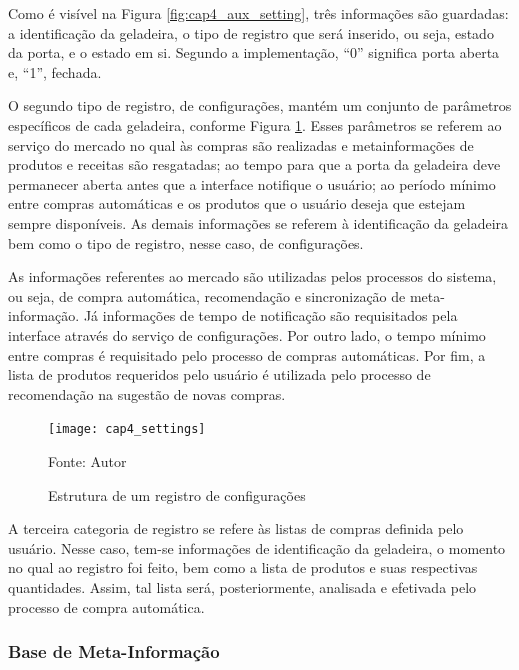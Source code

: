 Como é visível na Figura \ref{fig:cap4_aux_setting}, três informações são guardadas: a identificação da geladeira, o tipo de registro que será inserido, ou seja, estado da porta, e o estado em si. Segundo a implementação, ``0'' significa porta aberta e, ``1'', fechada.

O segundo tipo de registro, de configurações, mantém um conjunto de parâmetros específicos de cada geladeira, conforme Figura \ref{fig:cap4_settings}. Esses parâmetros se referem ao serviço do mercado no qual às compras são realizadas e metainformações de produtos e receitas são resgatadas; ao tempo para que a porta da geladeira deve permanecer aberta antes que a interface notifique o usuário; ao período mínimo entre compras automáticas e os produtos que o usuário deseja que estejam sempre disponíveis. As demais informações se referem à identificação da geladeira bem como o tipo de registro, nesse caso, de configurações.

As informações referentes ao mercado são utilizadas pelos processos do sistema, ou seja, de compra automática, recomendação e sincronização de meta-informação. Já informações de tempo de notificação são requisitados pela interface através do serviço de configurações. Por outro lado, o tempo mínimo entre compras é requisitado pelo processo de compras automáticas. Por fim, a lista de produtos requeridos pelo usuário é utilizada pelo processo de recomendação na sugestão de novas compras.

\begin{figure}[htb]
    \caption{Estrutura de um registro de configurações}
    \label{fig:cap4_settings}
    \texttt{[image: cap4\_settings]}
     
    Fonte: Autor
\end{figure}

A terceira categoria de registro se refere às listas de compras definida pelo usuário. Nesse caso, tem-se informações de identificação da geladeira, o momento no qual ao registro foi feito, bem como a lista de produtos e suas respectivas quantidades. Assim, tal lista será, posteriormente, analisada e efetivada pelo processo de compra automática.



\subsubsection{Base de Meta-Informação} \label{sssec:metainfo}

